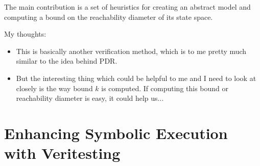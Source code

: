 The  main contribution is  a  set  of  heuristics  for  creating  an
abstract model and computing a bound on the reachability
diameter of its state space.

My thoughts:
\begin{itemize}
  \item This is basically another verification method, which is to me pretty much similar to the idea behind PDR.
  \item But the interesting thing which could be helpful to me and I need to look at closely is 
  the way bound $k$ is computed. If computing this bound or reachability diameter is easy, it could help us...
\end{itemize}



\section{Enhancing Symbolic Execution with Veritesting \cite{avgerinos2014}}


